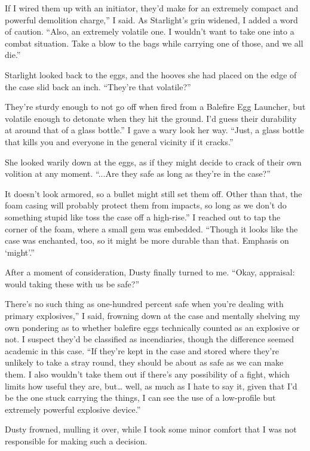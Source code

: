 \leavevmode{}If I wired them up with an initiator, they’d make for an extremely compact and powerful demolition charge,” I said. As Starlight’s grin widened, I added a word of caution. “Also, an extremely volatile one. I wouldn’t want to take one into a combat situation. Take a blow to the bags while carrying one of those, and we all die.”

Starlight looked back to the eggs, and the hooves she had placed on the edge of the case slid back an inch. “They’re that volatile?”

\leavevmode{}They’re sturdy enough to not go off when fired from a Balefire Egg Launcher, but volatile enough to detonate when they hit the ground. I’d guess their durability at around that of a glass bottle.” I gave a wary look her way. “Just, a glass bottle that kills you and everyone in the general vicinity if it cracks.”

She looked warily down at the eggs, as if they might decide to crack of their own volition at any moment. “...Are they safe as long as they’re in the case?”

\leavevmode{}It doesn’t look armored, so a bullet might still set them off. Other than that, the foam casing will probably protect them from impacts, so long as we don’t do something stupid like toss the case off a high-rise.” I reached out to tap the corner of the foam, where a small gem was embedded. “Though it looks like the case was enchanted, too, so it might be more durable than that. Emphasis on ‘might’.”

After a moment of consideration, Dusty finally turned to me. “Okay, appraisal: would taking these with us be safe?”

\leavevmode{}There’s no such thing as one-hundred percent safe when you’re dealing with primary explosives,” I said, frowning down at the case and mentally shelving my own pondering as to whether balefire eggs technically counted as an explosive or not. I suspect they’d be classified as incendiaries, though the difference seemed academic in this case. “If they’re kept in the case and stored where they’re unlikely to take a stray round, they should be about as safe as we can make them. I also wouldn’t take them out if there’s any possibility of a fight, which limits how useful they are, but… well, as much as I hate to say it, given that I’d be the one stuck carrying the things, I can see the use of a low-profile but extremely powerful explosive device.”

Dusty frowned, mulling it over, while I took some minor comfort that I was not responsible for making such a decision.

